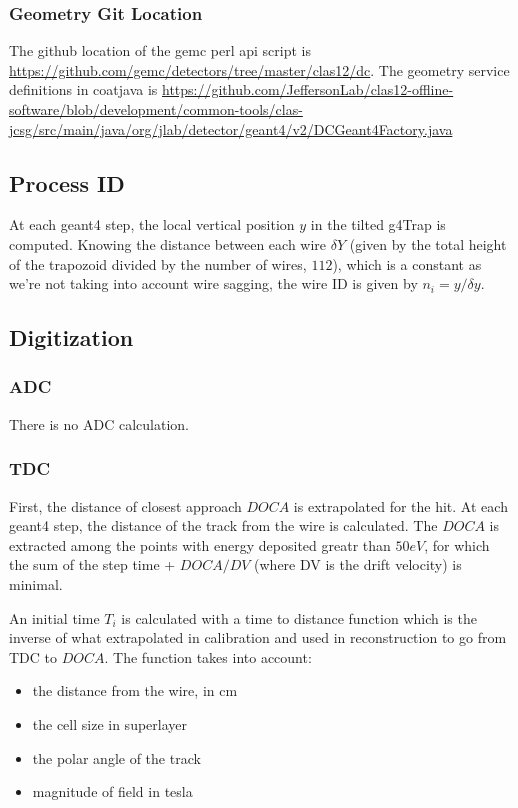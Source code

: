 \subsubsection{Geometry Git Location}

The github location of the gemc perl api script is \url{https://github.com/gemc/detectors/tree/master/clas12/dc}.
The geometry service definitions in coatjava is \url{https://github.com/JeffersonLab/clas12-offline-software/blob/development/common-tools/clas-jcsg/src/main/java/org/jlab/detector/geant4/v2/DCGeant4Factory.java}

\subsection{Process ID}
At each geant4 step, the local vertical position $y$ in the tilted g4Trap is computed. Knowing the distance
between each wire $\delta Y$ (given by the total height of the trapozoid divided by the number of wires, $112$), which is a constant as we're not taking into
account wire sagging, the wire ID is given by $n_i = y / \delta y$.


\subsection{Digitization}

\subsubsection{ADC}
There is no ADC calculation.

\subsubsection{TDC}
First, the distance of closest approach $DOCA$ is extrapolated for the hit. At each geant4 step, the distance of the track from the wire is calculated.
The $DOCA$ is extracted among the points with energy deposited greatr than $50 eV$, for which the sum of the step time + $DOCA / DV$ (where DV is the drift velocity) is minimal.

An initial time $T_i$ is calculated with a time to distance function which is the inverse of what extrapolated in calibration and used in reconstruction to go from TDC to $DOCA$.
The function takes into account:

\begin{itemize}
	\item the distance from the wire, in cm
	\item the cell size in superlayer
	\item the polar angle of the track
	\item magnitude of field in tesla
\end{itemize}


